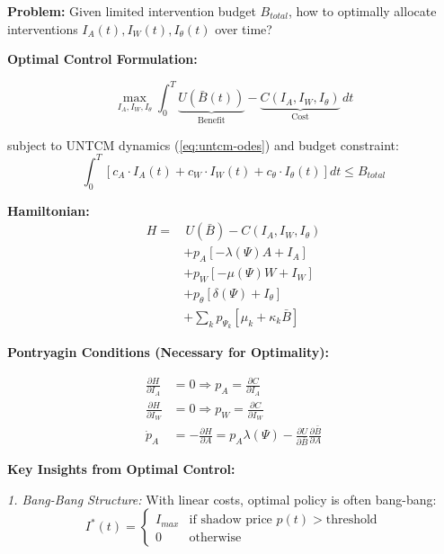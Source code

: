 \begin{tcolorbox}[colback=red!5!white, colframe=red!75!black,
    title=\textbf{Method UNTCM-M4: Optimal Control Framework}]

\textbf{Problem:} Given limited intervention budget $B_{total}$, how to optimally allocate interventions $I_A(t), I_W(t), I_\theta(t)$ over time?

\textbf{Optimal Control Formulation:}

\begin{equation}
\max_{I_A, I_W, I_\theta} \int_0^T \underbrace{U(\bar{B}(t))}_{\text{Benefit}} - \underbrace{C(I_A, I_W, I_\theta)}_{\text{Cost}} \, dt
\label{eq:optimal-control}
\end{equation}

subject to UNTCM dynamics (\ref{eq:untcm-odes}) and budget constraint:
\begin{equation}
\int_0^T \left[ c_A \cdot I_A(t) + c_W \cdot I_W(t) + c_\theta \cdot I_\theta(t) \right] dt \leq B_{total}
\end{equation}

\textbf{Hamiltonian:}
\begin{equation}
\begin{aligned}
H = & \, U(\bar{B}) - C(I_A, I_W, I_\theta) \\
    & + p_A \left[ -\lambda(\Psi) A + I_A \right] \\
    & + p_W \left[ -\mu(\Psi) W + I_W \right] \\
    & + p_\theta \left[ \delta(\Psi) + I_\theta \right] \\
    & + \sum_k p_{\Psi_k} \left[ \mu_k + \kappa_k \bar{B} \right]
\end{aligned}
\end{equation}

\textbf{Pontryagin Conditions (Necessary for Optimality):}

\begin{align}
\frac{\partial H}{\partial I_A} &= 0 \Rightarrow p_A = \frac{\partial C}{\partial I_A} \\
\frac{\partial H}{\partial I_W} &= 0 \Rightarrow p_W = \frac{\partial C}{\partial I_W} \\
\dot{p}_A &= -\frac{\partial H}{\partial A} = p_A \lambda(\Psi) - \frac{\partial U}{\partial \bar{B}} \frac{\partial \bar{B}}{\partial A}
\end{align}

\textbf{Key Insights from Optimal Control:}

\textit{1. Bang-Bang Structure:}
With linear costs, optimal policy is often bang-bang:
\begin{equation}
I^*(t) = \begin{cases}
I_{max} & \text{if shadow price } p(t) > \text{threshold} \\
0 & \text{otherwise}
\end{cases}
\end{equation}


\end{tcolorbox}
